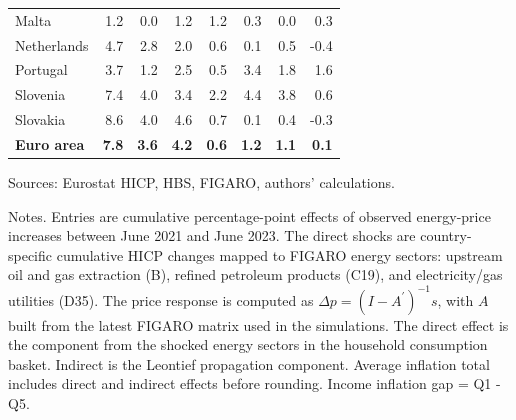 \begin{table}[H]
\begin{tabular}{lrrrrrrr}
Malta & 1.2 & 0.0 & 1.2 & 1.2 & 0.3 & 0.0 & 0.3
 \\
Netherlands & 4.7 & 2.8 & 2.0 & 0.6 & 0.1 & 0.5 & -0.4
 \\
Portugal & 3.7 & 1.2 & 2.5 & 0.5 & 3.4 & 1.8 & 1.6
 \\
Slovenia & 7.4 & 4.0 & 3.4 & 2.2 & 4.4 & 3.8 & 0.6
 \\
Slovakia & 8.6 & 4.0 & 4.6 & 0.7 & 0.1 & 0.4 & -0.3
 \\
\midrule
\textbf{Euro area} & \textbf{7.8} & \textbf{3.6} & \textbf{4.2} & \textbf{0.6} & \textbf{1.2} & \textbf{1.1} & \textbf{0.1}
 \\
\bottomrule
\end{tabular}
\par\vspace{0.35em}\footnotesize\noindent Sources: Eurostat HICP, HBS, FIGARO, authors' calculations.
\par\vspace{0.25em}\footnotesize\noindent Notes. Entries are cumulative percentage-point effects of observed energy-price increases between June 2021 and June 2023. The direct shocks are country-specific cumulative HICP changes mapped to FIGARO energy sectors: upstream oil and gas extraction (B), refined petroleum products (C19), and electricity/gas utilities (D35). The price response is computed as $\Delta p = (I - A^{\prime})^{-1}s$, with $A$ built from the latest FIGARO matrix used in the simulations. The direct effect is the component from the shocked energy sectors in the household consumption basket. Indirect is the Leontief propagation component. Average inflation total includes direct and indirect effects before rounding. Income inflation gap = Q1 - Q5.
\end{table}
\vspace{0.6em}
